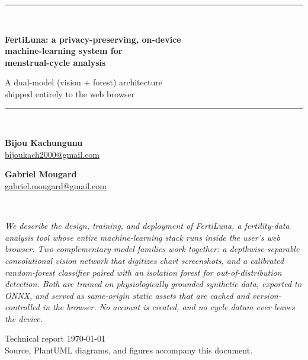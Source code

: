 \documentclass[11pt,a4paper]{article}
\begin{document}
\begin{titlepage}
\centering
\vspace*{1.5cm}
{\color{RuleGray}\rule{\textwidth}{0.8pt}}\\[0.6cm]
{\LARGE\bfseries FertiLuna: a privacy-preserving, on-device\\[0.25cm]
machine-learning system for\\[0.25cm] menstrual-cycle analysis\par}
\vspace{0.5cm}
{\large A dual-model (vision $+$ forest) architecture\\
shipped entirely to the web browser\par}
\vspace{0.4cm}
{\color{RuleGray}\rule{\textwidth}{0.8pt}}\\[1.2cm]

\begin{minipage}[t]{0.48\textwidth}
\raggedright
{\large\textbf{Bijou Kachungunu}}\\[0.2cm]
{\normalsize \href{mailto:bijoukach2000@gmail.com}{bijoukach2000@gmail.com}}
\end{minipage}\hfill
\begin{minipage}[t]{0.48\textwidth}
\raggedleft
{\large\textbf{Gabriel Mougard}}\\[0.2cm]
{\normalsize \href{mailto:gabriel.mougard@gmail.com}{gabriel.mougard@gmail.com}}
\end{minipage}\\[1.6cm]

\begin{minipage}{0.85\textwidth}
\small\itshape
\centering
We describe the design, training, and deployment of FertiLuna, a fertility-data
analysis tool whose entire machine-learning stack runs inside the user's web
browser. Two complementary model families work together: a depthwise-separable
\emph{convolutional vision network} that digitizes chart screenshots, and a
calibrated \emph{random-forest classifier} paired with an isolation forest for
out-of-distribution detection. Both are trained on physiologically grounded
synthetic data, exported to ONNX, and served as same-origin static assets that
are cached and version-controlled in the browser. No account is created, and no
cycle datum ever leaves the device.
\end{minipage}

\vfill
{\normalsize Technical report \textbullet{} \today}\\
{\footnotesize\color{RuleGray} Source, PlantUML diagrams, and figures accompany this document.}
\end{titlepage}
\end{document}
